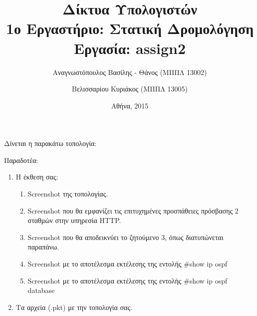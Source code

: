 \documentclass{assignment}
\title{Δίκτυα Υπολογιστών \\ 1ο Εργαστήριο: Στατική Δρομολόγηση \\ Εργασία: assign2}
\date{Αθήνα, 2015}
\author{Αναγνωστόπουλος Βασίλης - Θάνος (ΜΠΠΛ 13002) \and Βελισσαρίου Κυριάκος (ΜΠΠΛ 13005)}
\begin{document}
\maketitle

\setcounter{page}{1} 

\pagestyle{plain}
\tableofcontents
\listoftables
\listoffigures
\newpage

\setcounter{page}{1} 


Δίνεται η παρακάτω τοπολογία:

\begin{center}
\end{center}
 
Παραδοτέα:

\begin{enumerate}
  \item Η έκθεση σας:
  \begin{enumerate}
     \item Screenshot της τοπολογίας.
     \item Screenshot που θα εμφανίζει τις επιτυχημένες προσπάθειες πρόσβασης 2 σταθμών στην υπηρεσία HTTP.
     \item Screenshot που θα αποδεικνύει το ζητούμενο 3, όπως διατυπώνεται παραπάνω.
     \item Screenshot με το αποτέλεσμα εκτέλεσης της εντολής \#show ip ospf
     \item Screenshot με το αποτέλεσμα εκτέλεσης της εντολής \#show ip ospf database
  \end{enumerate}
  \item Τα αρχεία (.pkt) με την τοπολογία σας.
\end{enumerate}
\end{document}
